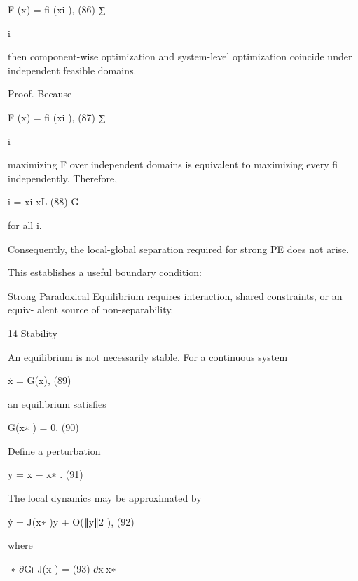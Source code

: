 \documentclass[10pt,a4paper]{article}
\begin{document}
\begin{ManuscriptText}
                                      F (x) =        fi (xi ),                             (86)
                                                ∑︂

                                                 i

then component-wise optimization and system-level optimization coincide under independent
feasible domains.

Proof. Because


                                      F (x) =        fi (xi ),                             (87)
                                                ∑︂

                                                 i

maximizing F over independent domains is equivalent to maximizing every fi independently.
Therefore,


                                            i = xi
                                           xL                                              (88)
                                                 G


for all i.

Consequently, the local-global separation required for strong PE does not arise.


This establishes a useful boundary condition:


      Strong Paradoxical Equilibrium requires interaction, shared constraints, or an equiv-
      alent source of non-separability.


14      Stability

An equilibrium is not necessarily stable.
For a continuous system


                                            ẋ = G(x),                                        (89)

an equilibrium satisfies


                                            G(x∗ ) = 0.                                       (90)

Define a perturbation


                                            y = x − x∗ .                                      (91)

The local dynamics may be approximated by


                                     ẏ = J(x∗ )y + O(∥y∥2 ),                                 (92)

where

                                                       ⃓
                                              ∗   ∂G ⃓⃓
                                          J(x ) =                                             (93)
                                                  ∂x ⃓x∗


\end{ManuscriptText}
\end{document}
